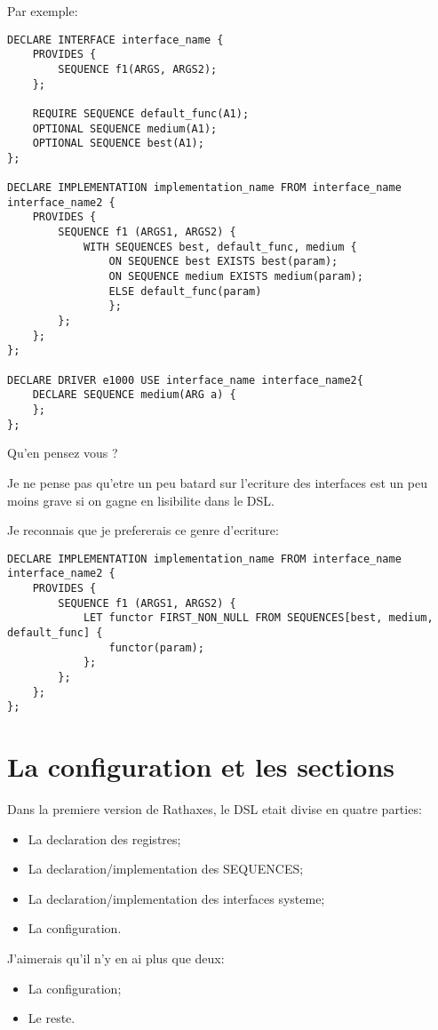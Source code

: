 \documentclass{rtxreport}
\begin{document}
Par exemple:

\begin{lstlisting}
DECLARE INTERFACE interface_name {
	PROVIDES {
		SEQUENCE f1(ARGS, ARGS2);
	};

	REQUIRE SEQUENCE default_func(A1);
	OPTIONAL SEQUENCE medium(A1);
	OPTIONAL SEQUENCE best(A1);
};

DECLARE IMPLEMENTATION implementation_name FROM interface_name interface_name2 {
	PROVIDES {
		SEQUENCE f1 (ARGS1, ARGS2) {
			WITH SEQUENCES best, default_func, medium {
				ON SEQUENCE best EXISTS best(param);
				ON SEQUENCE medium EXISTS medium(param);
				ELSE default_func(param)
				};
		};
	};
};

DECLARE DRIVER e1000 USE interface_name interface_name2{
	DECLARE SEQUENCE medium(ARG a) {
	};
};
\end{lstlisting}

Qu'en pensez vous ?

Je ne pense pas qu'etre un peu batard sur l'ecriture des interfaces
est un peu moins grave si on gagne en lisibilite dans le DSL.

Je reconnais que je prefererais ce genre d'ecriture:

\begin{lstlisting}
DECLARE IMPLEMENTATION implementation_name FROM interface_name interface_name2 {
	PROVIDES {
		SEQUENCE f1 (ARGS1, ARGS2) {
			LET functor FIRST_NON_NULL FROM SEQUENCES[best, medium, default_func] {
				functor(param);
			};
		};
	};
};
\end{lstlisting}


\chapter{La configuration et les sections}

Dans la premiere version de Rathaxes, le DSL etait divise en quatre parties:
\begin{itemize}
	\item La declaration des registres;
	\item La declaration/implementation des SEQUENCES;
	\item La declaration/implementation des interfaces systeme;
	\item La configuration.
\end{itemize}

J'aimerais qu'il n'y en ai plus que deux:

\begin{itemize}
	\item La configuration;
	\item Le reste.
\end{itemize}
\end{document}
